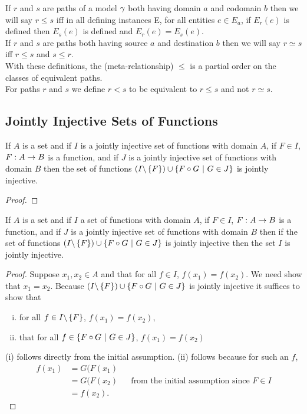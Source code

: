 \noindent If $r$ and $s$ are paths of a model $\gamma$ both having domain $a$ and codomain $b$ then we will say $r \leq s$ iff in all defining instances E, for all entities $e \in E_a$, if $E_r(e)$ is defined then $E_s(e)$ is defined and $E_r(e)=E_s(e)$. \\

\noindent If $r$ and $s$ are paths both having source $a$ and destination $b$ then we will say $r \simeq s$ iff $r \leq s$ and $s \leq r$. \\

\noindent With these definitions,  the (meta-relationship) $\leq$ is a partial order on the classes of equivalent paths. \\

\noindent For paths $r$ and $s$ we define $r < s$ to be equivalent to $r \leq s$ and not $r \simeq s$. \\

\subsection{Jointly Injective Sets of Functions}
\begin{lemma}
\label{jointlyinjectivecomposition}
If $A$ is a set and if $I$  is a jointly injective set of functions with domain $A$, if $F \in I$, $F: A \rightarrow B$ is a function,
and if $J$ is a jointly injective set of functions with domain $B$ then the set of functions
$(I \backslash \left\{F\right\}) \cup \left\{F \circ G \ \middle|\ G \in J\right\}$ is jointly injective.
\end{lemma}
\begin{proof}

\end{proof}

\begin{lemma}
\label{jointlyinjectivefactorisation}
If $A$ is a set and if $I$  a set of functions with domain $A$, if $F \in I$, $F: A \rightarrow B$ is a function,
and if $J$ is a jointly injective set of functions with domain $B$ then if the set of functions
$(I \backslash \left\{F\right\}) \cup \left\{F \circ G \ \middle|\ G \in J\right\}$ is jointly injective then the
set $I$ is jointly injective.
\end{lemma}
\begin{proof}
Suppose $x_1,x_2 \in A$ and that for all $f \in I$, $f(x_1)=f(x_2)$. We need show that $x_1=x_2$.
Because $(I \backslash \left\{F\right\}) \cup \left\{F \circ G \ \middle|\ G \in J\right\}$ is jointly injective
it suffices to show that 
\begin{enumerate}[(i)]
\item
for all $f \in I \backslash \left\{F\right\}$, $f(x_1)=f(x_2)$, 
\item that for all $f \in \left\{F \circ G \ \middle|\ G \in J\right\}$, $f(x_1)=f(x_2)$
\end{enumerate}
(i) follows directly from the initial assumption. 
(ii) follows because for such an $f$, 
\begin{align*}
f(x_1)&=G(F(x_1) & & \\
      &=G(F(x_2) & & \mbox{from the initial assumption since }F \in I \\
			&=f(x_2). & &
\end{align*}
\end{proof}

